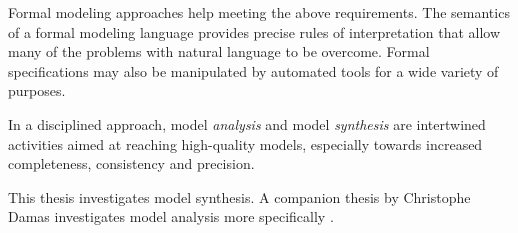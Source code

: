 Formal modeling approaches help meeting the above requirements. The semantics of a formal modeling language provides precise rules of interpretation that allow many of the problems with natural language to be overcome. Formal specifications may also be manipulated by automated tools for a wide variety of purposes. 

In a disciplined approach, model \emph{analysis} and model \emph{synthesis} are intertwined activities aimed at reaching high-quality models, especially towards increased completeness, consistency and precision.

This thesis investigates model synthesis. A companion thesis by Christophe Damas investigates model analysis more specifically \cite{Damas:2011}.
